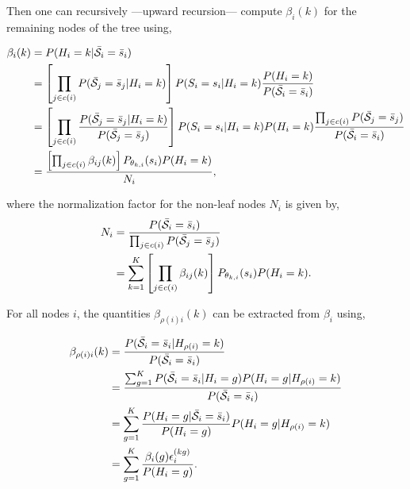 \documentclass[a4paper,11pt]{report}
\begin{document}
				Then one can recursively ---upward recursion--- compute $\beta_{i}(k)$ for the remaining nodes of the tree using,
				
				\begin{equation}
					\begin{split}
						\beta_{i}(k)	&= P(H_{i}=k | \bar{\mathcal{S}}_{i}= \bar{s}_{i})\\
													&= \left[ \prod_{j \in c(i)} P(\bar{\mathcal{S}}_{j}= \bar{s}_{j} | H_{i}=k) \right] P(S_{i}= s_{i} | H_{i}=k) \frac{P(H_{i}=k)} {P(\bar{\mathcal{S}}_{i}= \bar{s}_{i})}\\
													&= \left[ \prod_{j \in c(i)}  \frac{P(\bar{\mathcal{S}}_{j}= \bar{s}_{j} | H_{i}=k)} {P(\bar{\mathcal{S}}_{j}= \bar{s}_{j})} \right]
														P(S_{i}= s_{i} | H_{i}=k) P(H_{i}=k) 
														\frac{\prod_{j \in c(i)} P(\bar{\mathcal{S}}_{j}= \bar{s}_{j})} {P(\bar{\mathcal{S}}_{i}= \bar{s}_{i})}\\
													&= \frac{ \left[ \prod_{j \in c(i)} \beta_{ij}(k) \right] P_{\theta_{k,i}}(s_{i})P(H_{i}=k)}{N_{i}},
						\end{split}
						\label{eq:upward beta node}
				\end{equation}
				
				where the normalization factor for the non-leaf nodes $N_{i}$ is given by,
				\begin{equation}
					\begin{split}
						N_{i}	&= \frac{P(\bar{\mathcal{S}}_{i}= \bar{s}_{i})}{\prod_{j \in c(i)} P(\bar{\mathcal{S}}_{j}= \bar{s}_{j})}\\
									&= \sum_{k=1}^{K} \left[ \prod_{j \in c(i)} \beta_{ij}(k) \right]  P_{\theta_{k,i}}(s_{i})P(H_{i}=k).
					\end{split}
					\label{eq:upward normalization others}
				\end{equation}

				For all nodes $i$, the quantities $\beta_{\rho(i)i}(k)$ can be extracted from $\beta_{i}$ using,
				
				\begin{equation}
					\begin{split}
						\beta_{\rho(i)i}(k)	&= \frac{P(\bar{\mathcal{S}}_{i}= \bar{s}_{i} | H_{\rho(i)}=k)} {P(\bar{\mathcal{S}}_{i}= \bar{s}_{i}) }\\
																&= \frac{ \sum_{g=1}^{K} P(\bar{\mathcal{S}}_{i}= \bar{s}_{i} | H_{i}=g) P(H_{i}= g | H_{\rho(i)}=k)} {P(\bar{\mathcal{S}}_{i}= \bar{s}_{i}) }\\
																&= \sum_{g=1}^{K} \frac{ P(H_{i}=g | \bar{\mathcal{S}}_{i}= \bar{s}_{i})}{P(H_{i}=g)} P(H_{i}= g | H_{\rho(i)}=k)\\
																&= \sum_{g=1}^{K} \frac{\beta_{i}(g) \epsilon_{i}^{(kg)}}{P(H_{i}=g)}.
						\end{split}
						\label{eq:upward beta node and parents}
				\end{equation}
				
\end{document}
